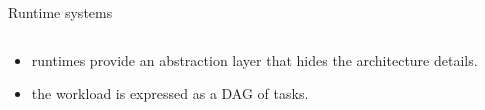 \documentclass[unknownkeysallowed]{beamer}
\begin{document}
\begin{frame}{Runtime systems}
\begin{columns}
\begin{column}{0.55\textwidth}
\begin{itemize}
      \item<2-> runtimes provide an abstraction layer that hides the
        architecture details.
      \item<3-> the workload is expressed as a DAG of tasks.
      \end{itemize}
    \end{column}
  \end{columns}
\end{frame}
\end{document}
